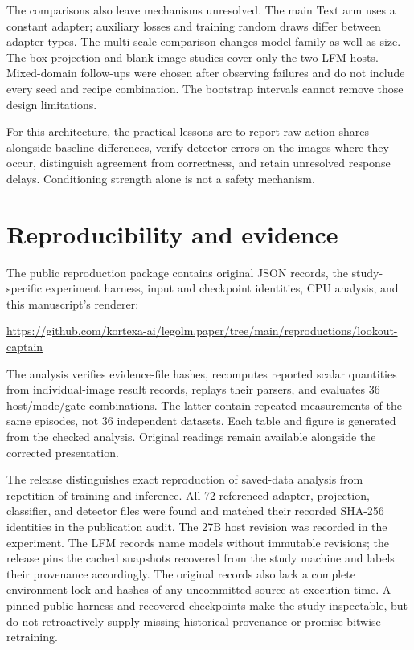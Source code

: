 \documentclass[10pt]{article}
\begin{document}
The comparisons also leave mechanisms unresolved. The main
Text arm uses a constant adapter; auxiliary losses and training
random draws differ between adapter types. The multi-scale
comparison changes model family as well as size. The box
projection and blank-image studies cover only the two LFM
hosts. Mixed-domain follow-ups were chosen after observing
failures and do not include every seed and recipe combination.
The bootstrap intervals cannot remove those design limitations.

For this architecture, the practical lessons are to report
raw action shares alongside baseline differences, verify
detector errors on the images where they occur, distinguish
agreement from correctness, and retain unresolved response
delays. Conditioning strength alone is not a safety mechanism.

\section{Reproducibility and evidence}
The public reproduction package contains \EvidenceFiles{} original
JSON records, the study-specific experiment harness, input and
checkpoint identities, CPU analysis, and this manuscript's
renderer:
\begin{center}
\url{https://github.com/kortexa-ai/legolm.paper/tree/main/reproductions/lookout-captain}
\end{center}
The analysis verifies evidence-file hashes, recomputes
\ScalarChecks{} reported scalar quantities from
\AuditedImageRecords{} individual-image result records, replays
their parsers, and evaluates 36 host/mode/gate combinations.
The latter contain repeated measurements of the same episodes,
not 36 independent datasets. Each table and figure is generated
from the checked analysis. Original readings remain available
alongside the corrected presentation.

The release distinguishes exact reproduction of saved-data
analysis from repetition of training and inference. All 72
referenced adapter, projection, classifier, and detector files
were found and matched their recorded SHA-256 identities in
the publication audit. The 27B host revision was recorded in
the experiment. The LFM records name models without immutable
revisions; the release pins the cached snapshots recovered
from the study machine and labels their provenance accordingly.
The original records also lack a complete environment lock
and hashes of any uncommitted source at execution time.
A pinned public harness and recovered checkpoints make the
study inspectable, but do not retroactively supply missing
historical provenance or promise bitwise retraining.
\end{document}

